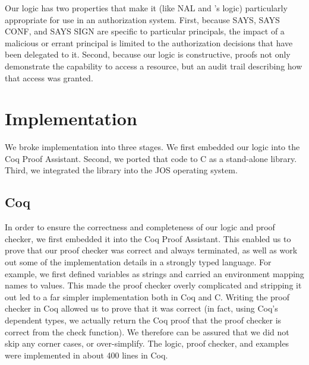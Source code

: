 \documentclass[10pt]{article}
\newcommand{\ruletext}[1]{{\scriptsize\textsf{#1}}}
\newcommand{\saysrule}{\ruletext{SAYS}}
\newcommand{\sayssignrule}{\ruletext{SAYS SIGN}}
\newcommand{\saysconfrule}{\ruletext{SAYS CONF}}
\begin{document}
\medskip
Our logic has two properties that make it (like NAL and \citet{Bauer}'s logic) particularly appropriate for use in an authorization system. First, because \saysrule{}, \saysconfrule{}, and \sayssignrule{} are specific to particular principals, the impact of a malicious or errant principal is limited to the authorization decisions that have been delegated to it.
Second, because our logic is constructive, proofs not only demonstrate the capability to access a resource, but an audit trail describing how that access was granted.

\section{Implementation}
\label{sec:impl}

We broke implementation into three stages.  We first embedded our logic into the Coq Proof Assistant.  Second, we ported that code to C as a stand-alone library.  Third, we integrated the library into the JOS operating system.
\subsection{Coq}
In order to ensure the correctness and completeness of our logic and proof checker, we first embedded it into the Coq Proof Assistant.  This enabled us to prove that our proof checker was correct and always terminated, as well as work out some of the implementation details in a strongly typed language.  For example, we first defined variables as strings and carried an environment mapping names to values.  This made the proof checker overly complicated and stripping it out led to a far simpler implementation both in Coq and C.  Writing the proof checker in Coq allowed us to prove that it was correct (in fact, using Coq's dependent types, we actually return the Coq proof that the proof checker is correct from the check function).  We therefore can be assured that we did not skip any corner cases, or over-simplify.  The logic, proof checker, and examples were implemented in about 400 lines in Coq.
\end{document}
